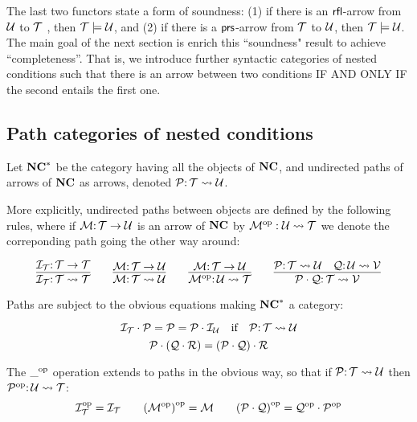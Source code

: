 The last two functors state a form of soundness: (1) if there is an ${\mathsf{rfl}}$-arrow from ${\mathcal{U}}$ to ${\mathcal{T}}$ , then ${\mathcal{T}} \models {\mathcal{U}}$, and (2)  if there is a ${\mathsf{prs}}$-arrow from ${\mathcal{T}}$ to ${\mathcal{U}}$, then ${\mathcal{T}} \models {\mathcal{U}}$. 
The main goal of the next section is enrich this ``soundness" result to achieve ``completeness''. That is, we introduce further syntactic categories of nested conditions such that there is an arrow between two conditions IF AND ONLY IF the second entails the first one.

\subsection{Path categories of nested conditions}

\begin{definition}
    Let $\mathbf{NC}^*$ be the category having all the objects of $\mathbf{NC}$, and undirected paths of arrows of $\mathbf{NC}$ as arrows, denoted ${\mathcal{P}}{:}\, {\mathcal{T}} \leadsto {\mathcal{U}}$. 

    More explicitly, undirected paths between objects are defined by the following rules, where if ${\mathcal{M}}{:}\, {\mathcal{T}} \rightarrow {\mathcal{U}}$ is an arrow of $\mathbf{NC}$ by ${{\mathcal{M}}}^{\mathrm{op}}: {\mathcal{U}} \leadsto {\mathcal{T}}$ we denote the correponding path going the other way around:



    $$ \infer{\cI_\cT\of \cT \leadsto \cT}{\cI_\cT\of \cT \to \cT} \qquad 
    \infer{\cM \of \cT \leadsto \cU}{\cM \of \cT \to \cU} \qquad 
    \infer{\op{\cM} \of \cU \leadsto \cT}{\cM \of \cT \to \cU}\qquad
    \infer{\cP \cdot \cQ \of \cT \leadsto \cV}{\cP\of \cT \leadsto \cU & \cQ \of \cU \leadsto \cV}$$

    Paths are subject to the obvious equations making $\mathbf{NC}^*$ a category:

    $$ {\mathcal{I}}_{\mathcal{T}} \cdot {\mathcal{P}} = {\mathcal{P}} = {\mathcal{P}} \cdot {\mathcal{I}}_{\mathcal{U}} \mbox{\quad if\quad} {\mathcal{P}}{:}\, {\mathcal{T}} \leadsto {\mathcal{U}}$$
    $${\mathcal{P}} \cdot ({\mathcal{Q}} \cdot {\mathcal{R}}) = ({\mathcal{P}} \cdot {\mathcal{Q}}) \cdot {\mathcal{R}}$$
    
    The ${\_}^{\mathrm{op}}$ operation extends to paths in the obvious way, so that if ${\mathcal{P}}{:}\, {\mathcal{T}} \leadsto {\mathcal{U}}$ then ${{\mathcal{P}}}^{\mathrm{op}}{:}\, {\mathcal{U}} \leadsto {\mathcal{T}}$:
$$ {{\mathcal{I}}}^{\mathrm{op}}_{\mathcal{T}} = {\mathcal{I}}_{\mathcal{T}} \qquad 
{({{\mathcal{M}}}^{\mathrm{op}})}^{\mathrm{op}} = {\mathcal{M}} \qquad {({\mathcal{P}}\cdot {\mathcal{Q}})}^{\mathrm{op}} = {{\mathcal{Q}}}^{\mathrm{op}} \cdot {{\mathcal{P}}}^{\mathrm{op}} $$ 
\end{definition}

